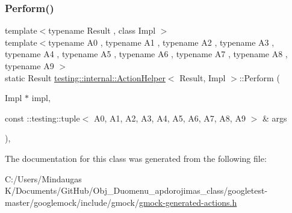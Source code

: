 \mbox{\label{classtesting_1_1internal_1_1_action_helper_adfe6c86332cc09b352ec5ccbad1d3988}} 
\subsubsection{\texorpdfstring{Perform()}{Perform()}\hspace{0.1cm}{\footnotesize\ttfamily [33/33]}}
{\footnotesize\ttfamily template$<$typename Result , class Impl $>$ \\
template$<$typename A0 , typename A1 , typename A2 , typename A3 , typename A4 , typename A5 , typename A6 , typename A7 , typename A8 , typename A9 $>$ \\
static Result \mbox{\hyperlink{classtesting_1_1internal_1_1_action_helper}{testing\+::internal\+::\+Action\+Helper}}$<$ Result, Impl $>$\+::Perform (\begin{DoxyParamCaption}\item[{Impl $\ast$}]{impl,  }\item[{const \+::testing\+::tuple$<$ A0, A1, A2, A3, A4, A5, A6, A7, A8, A9 $>$ \&}]{args }\end{DoxyParamCaption})\hspace{0.3cm}{\ttfamily [inline]}, {\ttfamily [static]}}



The documentation for this class was generated from the following file\+:\begin{DoxyCompactItemize}
\item 
C\+:/\+Users/\+Mindaugas K/\+Documents/\+Git\+Hub/\+Obj\+\_\+\+Duomenu\+\_\+apdorojimas\+\_\+class/googletest-\/master/googlemock/include/gmock/\mbox{\hyperlink{googletest-master_2googlemock_2include_2gmock_2gmock-generated-actions_8h}{gmock-\/generated-\/actions.\+h}}\end{DoxyCompactItemize}

